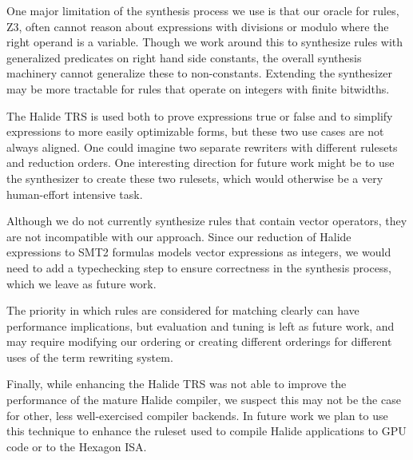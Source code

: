 \documentclass[acmsmall,review,anonymous]{acmart}\settopmatter{printfolios=true,printccs=false,printacmref=false}
\begin{document}
One major limitation of the synthesis process we use is that our oracle
for rules, Z3, often cannot reason about expressions with divisions or modulo
where the right operand is a variable.  Though we work around this to
synthesize rules with generalized predicates on right hand side constants,
the overall synthesis machinery cannot generalize these to non-constants.
Extending the synthesizer may be more tractable for rules that operate
on integers with finite bitwidths.

The Halide TRS is used both to prove expressions true or false and to
simplify expressions to more easily optimizable forms, but these two use cases
are not always aligned. One could imagine two separate rewriters with
different rulesets and reduction orders. One interesting direction for future
work might be to use the synthesizer to create these two rulesets, which would
otherwise be a very human-effort intensive task.

Although we do not currently synthesize rules that contain vector operators,
they are not incompatible with our approach. Since our reduction of Halide
expressions to SMT2 formulas models vector expressions as integers, we would need
to add a typechecking step to ensure correctness in the synthesis process, which
we leave as future work.

The priority in which rules are considered for matching clearly can have
performance implications, but evaluation and tuning is left as future work, and
may require modifying our ordering or creating different orderings for different
uses of the term rewriting system.

Finally, while enhancing the Halide TRS was not able to improve the performance of the mature Halide compiler, we suspect this may not be the case for other, less well-exercised compiler backends. In future work we plan to use this technique to enhance the ruleset used to compile Halide applications to GPU code or to the Hexagon ISA.
\end{document}
